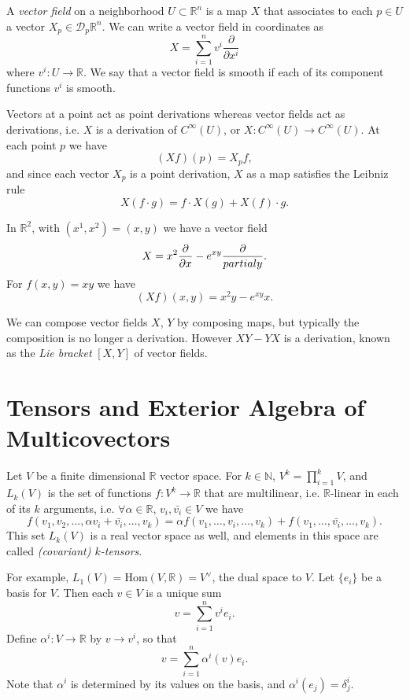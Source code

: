 \begin{defn}
A \emph{vector field} on a neighborhood $U \subset \mathbb{R}^n$ is a
map $X$ that associates to each $p \in U$ a vector
$X_p \in \mathcal{D}_p \mathbb{R}^n$. We can write a vector field in
coordinates as
$$
X = \sum_{i=1}^n v^i \frac{\partial}{\partial x^i}
$$
where $v^i : U \to \mathbb{R}$. We say that a vector field is smooth
if each of its component functions $v^i$ is smooth.
\end{defn}

Vectors at a point act as point derivations whereas vector fields act
as derivations, i.e. $X$ is a derivation of $C^\infty(U)$,
or $X: C^\infty(U) \to C^\infty(U)$. At each point $p$ we have
$$
(X f)(p) = X_p f,
$$
and since each vector $X_p$ is a point derivation, $X$ as a map
satisfies the Leibniz rule
$$
X (f \cdot g) = f \cdot X(g) + X(f) \cdot g.
$$

\begin{xmpl}
In $\mathbb{R}^2$, with $(x^1, x^2) = (x, y)$ we have a vector field
$$
X = x^2 \frac{\partial}{\partial x} - e^{xy} \frac{\partial}{\\partial y}.
$$
For $f(x, y) = xy$ we have
$$
(Xf)(x, y) = x^2 y - e^{xy} x.
$$
\end{xmpl}

We can compose vector fields $X$, $Y$ by composing maps, but typically
the composition is no longer a derivation. However $XY - YX$ is a
derivation, known as the \emph{Lie bracket} $[X, Y]$ of vector fields.

\section{Tensors and Exterior Algebra of Multicovectors}

Let $V$ be a finite dimensional $\mathbb{R}$ vector space.
For $k \in \mathbb{N}$,
$V^k = \prod_{i=1}^k V$, and
$L_k(V)$ is the set of functions $f: V^k \to \mathbb{R}$ that are
multilinear, i.e. $\mathbb{R}$-linear in each of its $k$ arguments,
i.e. $\forall \alpha \in \mathbb{R}$, $v_i, \bar{v_i} \in V$ we have
$$
  f(v_1, v_2, \dots, \alpha v_i + \bar{v_i}, \dots, v_k)
= \alpha f(v_1, \dots, v_i, \dots, v_k)
+ f(v_1, \dots, \bar{v_i}, \dots, v_k).
$$
This set $L_k(V)$ is a real vector space as well, and elements in this
space are called \emph{(covariant) $k$-tensors}.

For example, $L_1(V) = \mathrm{Hom}(V, \mathbb{R}) = V^\vee$, the dual
space to $V$. Let $\{ e_i \}$ be a basis for $V$. Then each $v \in V$
is a unique sum
$$
  v
= \sum_{i=1}^n v^i e_i.
$$
Define $\alpha^i : V \to \mathbb{R}$ by $v \to v^i$, so that
$$
  v
= \sum_{i=1}^n \alpha^i(v) e_i.
$$
Note that $\alpha^i$ is determined by its values on the basis,
and $\alpha^i(e_j) = \delta_j^i$.

